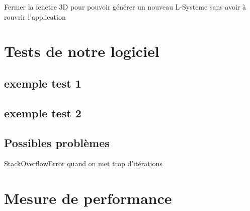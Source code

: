 Fermer la fenetre 3D pour pouvoir générer un nouveau L-Systeme sans avoir à rouvrir l'application

\section{Tests de notre logiciel}

\subsection{exemple test 1}

\subsection{exemple test 2}

\subsection{Possibles problèmes}

StackOverflowError quand on met trop d'itérations

\section{Mesure de performance}